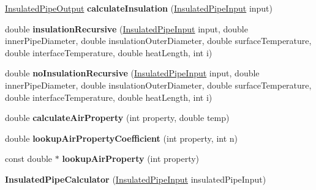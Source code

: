 \begin{DoxyCompactItemize}
\item 
\mbox{\label{class_insulated_pipe_calculator_a6cca6d6e69ee7c30dd68123678412652}} 
\hyperlink{class_insulated_pipe_output}{Insulated\+Pipe\+Output} {\bfseries calculate\+Insulation} (\hyperlink{class_insulated_pipe_input}{Insulated\+Pipe\+Input} input)
\item 
\mbox{\label{class_insulated_pipe_calculator_a56eff4f9840a7c9dfc49c3ad99183660}} 
double {\bfseries insulation\+Recursive} (\hyperlink{class_insulated_pipe_input}{Insulated\+Pipe\+Input} input, double inner\+Pipe\+Diameter, double insulation\+Outer\+Diameter, double surface\+Temperature, double interface\+Temperature, double heat\+Length, int i)
\item 
\mbox{\label{class_insulated_pipe_calculator_a9659b458041d78e7ae8cd6521b7ffb32}} 
double {\bfseries no\+Insulation\+Recursive} (\hyperlink{class_insulated_pipe_input}{Insulated\+Pipe\+Input} input, double inner\+Pipe\+Diameter, double insulation\+Outer\+Diameter, double surface\+Temperature, double interface\+Temperature, double heat\+Length, int i)
\item 
\mbox{\label{class_insulated_pipe_calculator_a411f18d08cfd339784cbafde971c875a}} 
double {\bfseries calculate\+Air\+Property} (int property, double temp)
\item 
\mbox{\label{class_insulated_pipe_calculator_ad53128ebc9650dcf15e1ca64820cfa1b}} 
double {\bfseries lookup\+Air\+Property\+Coefficient} (int property, int n)
\item 
\mbox{\label{class_insulated_pipe_calculator_af645925534076df7861aa95b73b09902}} 
const double $\ast$ {\bfseries lookup\+Air\+Property} (int property)
\item 
\mbox{\label{class_insulated_pipe_calculator_a829afd10d8b97bb5bcfd936b5b153ce5}} 
{\bfseries Insulated\+Pipe\+Calculator} (\hyperlink{class_insulated_pipe_input}{Insulated\+Pipe\+Input} insulated\+Pipe\+Input)
\item 
\mbox{\label{class_insulated_pipe_calculator_a12cf1b2f8aa76989c6e805cbedfe0b2a}} 

\end{DoxyCompactItemize}
